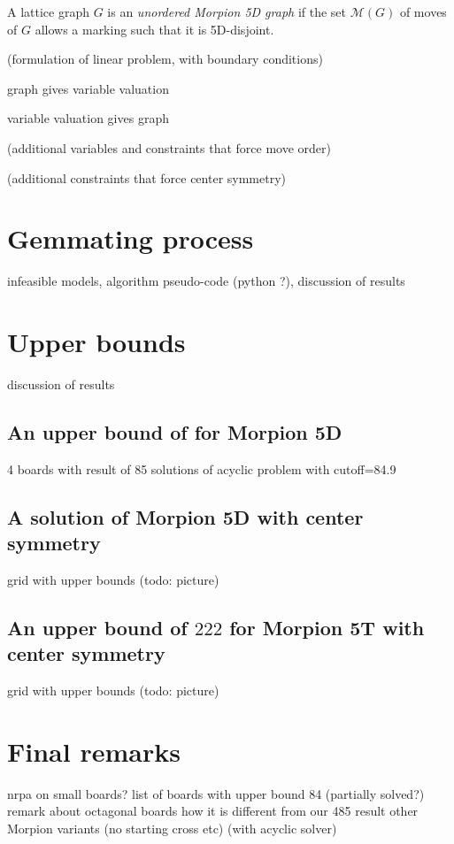 \documentclass[a4paper,UKenglish]{lipics}
\begin{document}
\begin{definition}
  A lattice graph $G$ is an \emph{unordered Morpion 5D graph} if the set $\mathcal{M}(G)$ of moves of $G$ allows a marking such that it is 5D-disjoint.
\end{definition}

(formulation of linear problem, with boundary conditions)

\begin{theorem}
  graph gives variable valuation
\end{theorem}

\begin{theorem}
  variable valuation gives graph
\end{theorem}

(additional variables and constraints that force move order)

(additional constraints that force center symmetry)

\section{Gemmating process}

  infeasible models, 
  algorithm pseudo-code (python ?),
  discussion of results

\section{Upper bounds}

  discussion of results
  
\subsection{An upper bound of \therecord for Morpion 5D}

  4 boards with result of 85
  solutions of acyclic problem with cutoff=84.9

\subsection{A solution of Morpion 5D with center symmetry}

  grid with upper bounds (todo: picture)
  
\subsection{An upper bound of $222$ for Morpion 5T with center symmetry}

  grid with upper bounds (todo: picture)

\section{Final remarks}
  nrpa on small boards?
  list of boards with upper bound 84 (partially solved?)
  remark about octagonal boards
  how it is different from our 485 result
  other Morpion variants (no starting cross etc)
    (with acyclic solver)

\printbibliography 
%
    
\end{document}
